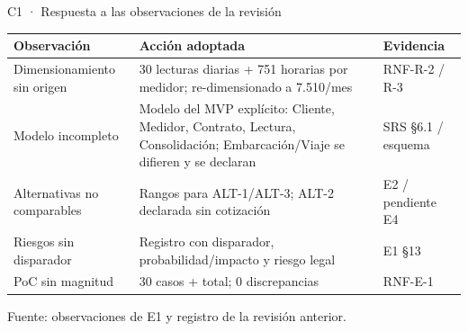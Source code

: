 \documentclass[aspectratio=169,10pt]{beamer}
\begin{document}
\begin{frame}{C1 · Respuesta a las observaciones de la revisión}
  \scriptsize
  \renewcommand{\arraystretch}{1.25}
  \begin{tabular}{@{}p{} p{} p{}@{}}
    \toprule
    \textbf{Observación} & \textbf{Acción adoptada} & \textbf{Evidencia} \\
    \midrule
    Dimensionamiento sin origen & 30 lecturas diarias + 751 horarias por medidor; re-dimensionado a 7.510/mes & RNF-R-2 / R-3 \\
    Modelo incompleto & Modelo del MVP explícito: Cliente, Medidor, Contrato, Lectura, Consolidación; Embarcación/Viaje se difieren y se declaran & SRS \S6.1 / esquema \\
    Alternativas no comparables & Rangos para ALT-1/ALT-3; ALT-2 declarada sin cotización & E2 / pendiente E4 \\
    Riesgos sin disparador & Registro con disparador, probabilidad/impacto y riesgo legal & E1 \S13 \\
    PoC sin magnitud & 30 casos + total; 0 discrepancias & RNF-E-1 \\
    \bottomrule
  \end{tabular}
  \vspace{1.5mm}

  {\tiny Fuente: observaciones de E1 y registro de la revisión anterior.}
\end{frame}
\end{document}
